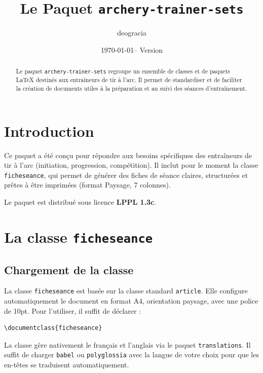 \documentclass[a4paper,11pt]{article}
\title{\textbf{Le Paquet \texttt{archery-trainer-sets}}}
\author{deogracia}
\date{\today \quad -- \quad Version \pkgversion}
\begin{document}
\maketitle

\begin{abstract}
Le paquet \texttt{archery-trainer-sets} regroupe un ensemble de classes et de paquets \LaTeX{} destinés aux entraîneurs de tir à l'arc. Il permet de standardiser et de faciliter la création de documents utiles à la préparation et au suivi des séances d'entraînement.
\end{abstract}

\tableofcontents
\vspace{1cm}

\section{Introduction}
Ce paquet a été conçu pour répondre aux besoins spécifiques des entraîneurs de tir à l'arc (initiation, progression, compétition). Il inclut pour le moment la classe \texttt{ficheseance}, qui permet de générer des fiches de séance claires, structurées et prêtes à être imprimées (format Paysage, 7 colonnes).

Le paquet est distribué sous licence \textbf{LPPL 1.3c}.

\section{La classe \texttt{ficheseance}}

\subsection{Chargement de la classe}
La classe \texttt{ficheseance} est basée sur la classe standard \texttt{article}. Elle configure automatiquement le document en format A4, orientation paysage, avec une police de 10pt. 
Pour l'utiliser, il suffit de déclarer :
\begin{lstlisting}
\documentclass{ficheseance}
\end{lstlisting}

La classe gère nativement le français et l'anglais via le paquet \texttt{translations}. Il suffit de charger \texttt{babel} ou \texttt{polyglossia} avec la langue de votre choix pour que les en-têtes se traduisent automatiquement.
\end{document}
